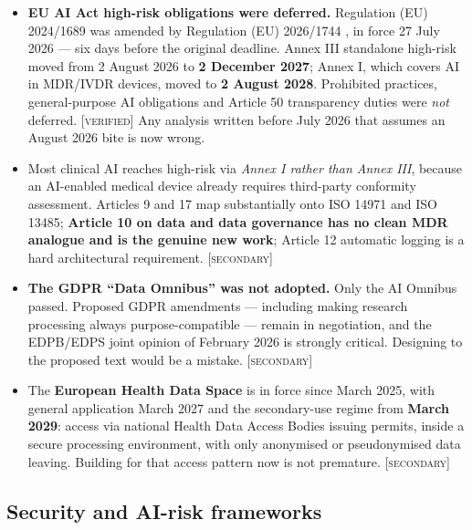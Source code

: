 \documentclass[11pt,a4paper]{article}
\newcommand{\flag}[1]{\textcolor{flagcolor}{\textbf{#1}}}
\newcommand{\verified}{\textsc{[verified]}}
\newcommand{\secondary}{\textsc{[secondary]}}
\begin{document}
\begin{itemize}
  \item \flag{EU AI Act high-risk obligations were deferred.} Regulation
  (EU) 2024/1689 \citep{euaiact2024} was amended by Regulation (EU)
  2026/1744 \citep{euomnibus2026}, in force 27 July 2026 --- six days before
  the original deadline. Annex III standalone high-risk moved from 2 August
  2026 to \textbf{2 December 2027}; Annex I, which covers AI in MDR/IVDR
  devices, moved to \textbf{2 August 2028}. Prohibited practices,
  general-purpose AI obligations and Article 50 transparency duties were
  \emph{not} deferred. \verified{} Any analysis written before July 2026 that
  assumes an August 2026 bite is now wrong.

  \item Most clinical AI reaches high-risk via \emph{Annex I rather than
  Annex III}, because an AI-enabled medical device already requires
  third-party conformity assessment. Articles 9 and 17 map substantially
  onto ISO 14971 and ISO 13485; \textbf{Article 10 on data and data
  governance has no clean MDR analogue and is the genuine new work};
  Article 12 automatic logging is a hard architectural requirement.
  \secondary

  \item \flag{The GDPR ``Data Omnibus'' was not adopted.} Only the AI
  Omnibus passed. Proposed GDPR amendments --- including making research
  processing always purpose-compatible --- remain in negotiation, and the
  EDPB/EDPS joint opinion of February 2026 is strongly critical. Designing
  to the proposed text would be a mistake. \secondary

  \item The \textbf{European Health Data Space} \citep{ehds2025} is in force
  since March 2025, with general application March 2027 and the
  secondary-use regime from \textbf{March 2029}: access via national Health
  Data Access Bodies issuing permits, inside a secure processing
  environment, with only anonymised or pseudonymised data leaving. Building
  for that access pattern now is not premature. \secondary
\end{itemize}

\subsection{Security and AI-risk frameworks}
\end{document}
